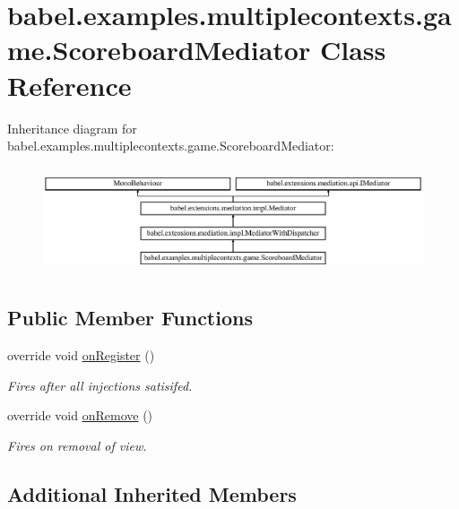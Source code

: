 \hypertarget{classbabel_1_1examples_1_1multiplecontexts_1_1game_1_1_scoreboard_mediator}{\section{babel.\-examples.\-multiplecontexts.\-game.\-Scoreboard\-Mediator Class Reference}
\label{classbabel_1_1examples_1_1multiplecontexts_1_1game_1_1_scoreboard_mediator}
}
Inheritance diagram for babel.\-examples.\-multiplecontexts.\-game.\-Scoreboard\-Mediator\-:\begin{figure}[H]
\begin{center}
\leavevmode
\includegraphics[height=3.163842cm]{classbabel_1_1examples_1_1multiplecontexts_1_1game_1_1_scoreboard_mediator}
\end{center}
\end{figure}
\subsection*{Public Member Functions}
\begin{DoxyCompactItemize}
\item 
override void \hyperlink{classbabel_1_1examples_1_1multiplecontexts_1_1game_1_1_scoreboard_mediator_aea9aaef56a2c8d2db6824291d26eac13}{on\-Register} ()
\begin{DoxyCompactList}\small\item\em Fires after all injections satisifed. \end{DoxyCompactList}\item 
override void \hyperlink{classbabel_1_1examples_1_1multiplecontexts_1_1game_1_1_scoreboard_mediator_a42b541ca9978bbd2e921c0db02be1bf5}{on\-Remove} ()
\begin{DoxyCompactList}\small\item\em Fires on removal of view. \end{DoxyCompactList}\end{DoxyCompactItemize}
\subsection*{Additional Inherited Members}


